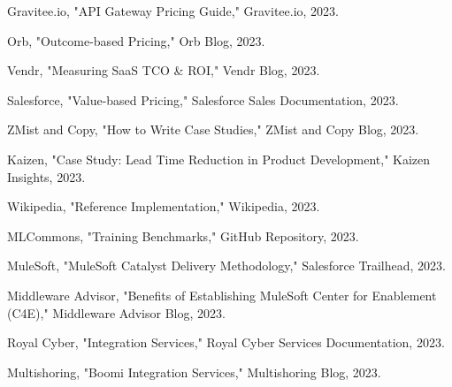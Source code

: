 \documentclass[11pt,a4paper]{article}
\begin{document}
\begin{thebibliography}{99}
 Gravitee.io, "API Gateway Pricing Guide," Gravitee.io, 2023.

 Orb, "Outcome-based Pricing," Orb Blog, 2023.

 Vendr, "Measuring SaaS TCO \& ROI," Vendr Blog, 2023.

 Salesforce, "Value-based Pricing," Salesforce Sales Documentation, 2023.

 ZMist and Copy, "How to Write Case Studies," ZMist and Copy Blog, 2023.

 Kaizen, "Case Study: Lead Time Reduction in Product Development," Kaizen Insights, 2023.

 Wikipedia, "Reference Implementation," Wikipedia, 2023.

 MLCommons, "Training Benchmarks," GitHub Repository, 2023.

 MuleSoft, "MuleSoft Catalyst Delivery Methodology," Salesforce Trailhead, 2023.

 Middleware Advisor, "Benefits of Establishing MuleSoft Center for Enablement (C4E)," Middleware Advisor Blog, 2023.

 Royal Cyber, "Integration Services," Royal Cyber Services Documentation, 2023.

 Multishoring, "Boomi Integration Services," Multishoring Blog, 2023.

\end{thebibliography}



\end{document}
